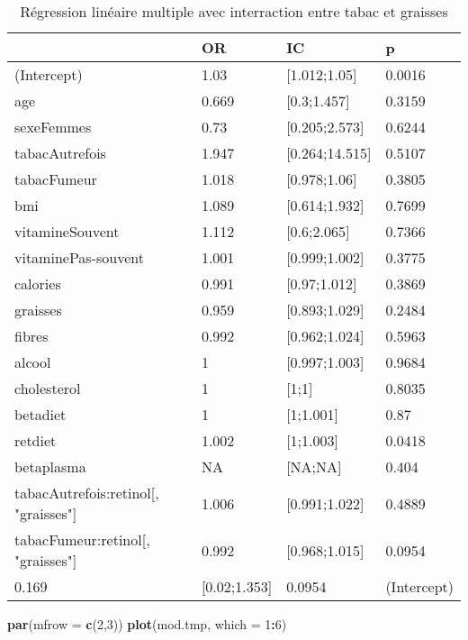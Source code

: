 \documentclass[]{article}
\newenvironment{Shaded}{\begin{snugshade}}{\end{snugshade}}
\newcommand{\KeywordTok}[1]{\textcolor[rgb]{0.13,0.29,0.53}{\textbf{#1}}}
\newcommand{\DataTypeTok}[1]{\textcolor[rgb]{0.13,0.29,0.53}{#1}}
\newcommand{\DecValTok}[1]{\textcolor[rgb]{0.00,0.00,0.81}{#1}}
\newcommand{\OperatorTok}[1]{\textcolor[rgb]{0.81,0.36,0.00}{\textbf{#1}}}
\newcommand{\NormalTok}[1]{#1}
\begin{document}
\begin{table}

\caption{\label{tab:unnamed-chunk-85}Régression linéaire multiple avec interraction entre tabac et graisses}
\centering
\begin{tabular}[t]{l|l|l|l}
\hline
  & OR & IC & p\\
\hline
\rowcolor[HTML]{BBD2E1}  (Intercept) & 1.03 & [1.012;1.05] & 0.0016\\
\hline
age & 0.669 & [0.3;1.457] & 0.3159\\
\hline
\rowcolor[HTML]{BBD2E1}  sexeFemmes & 0.73 & [0.205;2.573] & 0.6244\\
\hline
tabacAutrefois & 1.947 & [0.264;14.515] & 0.5107\\
\hline
\rowcolor[HTML]{BBD2E1}  tabacFumeur & 1.018 & [0.978;1.06] & 0.3805\\
\hline
bmi & 1.089 & [0.614;1.932] & 0.7699\\
\hline
\rowcolor[HTML]{BBD2E1}  vitamineSouvent & 1.112 & [0.6;2.065] & 0.7366\\
\hline
vitaminePas-souvent & 1.001 & [0.999;1.002] & 0.3775\\
\hline
\rowcolor[HTML]{BBD2E1}  calories & 0.991 & [0.97;1.012] & 0.3869\\
\hline
graisses & 0.959 & [0.893;1.029] & 0.2484\\
\hline
\rowcolor[HTML]{BBD2E1}  fibres & 0.992 & [0.962;1.024] & 0.5963\\
\hline
alcool & 1 & [0.997;1.003] & 0.9684\\
\hline
\rowcolor[HTML]{BBD2E1}  cholesterol & 1 & [1;1] & 0.8035\\
\hline
betadiet & 1 & [1;1.001] & 0.87\\
\hline
\rowcolor[HTML]{BBD2E1}  retdiet & 1.002 & [1;1.003] & 0.0418\\
\hline
betaplasma & NA & [NA;NA] & 0.404\\
\hline
\rowcolor[HTML]{BBD2E1}  tabacAutrefois:retinol[, "graisses"] & 1.006 & [0.991;1.022] & 0.4889\\
\hline
tabacFumeur:retinol[, "graisses"] & 0.992 & [0.968;1.015] & 0.0954\\
\hline
\rowcolor[HTML]{BBD2E1}  0.169 & [0.02;1.353] & 0.0954 & (Intercept)\\
\hline
\end{tabular}
\end{table}

\begin{Shaded}
\begin{Highlighting}[]
\KeywordTok{par}\NormalTok{(}\DataTypeTok{mfrow =} \KeywordTok{c}\NormalTok{(}\DecValTok{2}\NormalTok{,}\DecValTok{3}\NormalTok{))}
\KeywordTok{plot}\NormalTok{(mod.tmp, }\DataTypeTok{which =} \DecValTok{1}\OperatorTok{:}\DecValTok{6}\NormalTok{)}
\end{Highlighting}
\end{Shaded}
\end{document}

